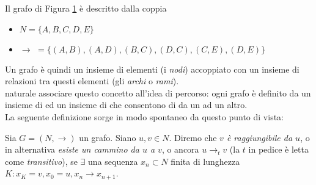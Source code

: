 \begin{example}
    \begin{figure}[t]
        \centering
        \caption{}
        \label{fig:graph}
    \end{figure}
    Il grafo di Figura \ref*{fig:graph} è descritto dalla coppia
    \begin{itemize}
        \item $N = \{A,B,C,D,E\}$
        \item $\to \,\,= \{(A,B), (A,D), (B,C), (D,C), (C,E), (D,E)\}$
    \end{itemize}
\end{example}
Un grafo è quindi un insieme di elementi (i \textit{nodi}) accoppiato con un insieme di relazioni tra questi elementi (gli \textit{archi} o \textit{rami}).\\
 naturale associare questo concetto all'idea di percorso: ogni grafo è definito da un insieme di  ed un insieme di  che consentono di 
da un  ad un altro.\\
La seguente definizione sorge in modo spontaneo da questo punto di vista:
\begin{definition}
    Sia $G = (N, \to)$ un grafo. Siano $u,v \in N$. Diremo che \textit{$v$ è raggiungibile da $u$}, o in alternativa \textit{esiste un cammino da $u$ a $v$}, o ancora $u \to_t v$ (la $t$ in pedice è letta come \textit{transitivo}), se
    $\exists$ una sequenza $x_n \subset N$ finita di lunghezza $K : x_K = v, x_0 = u, x_n \to x_{n+1}$.
\end{definition}
